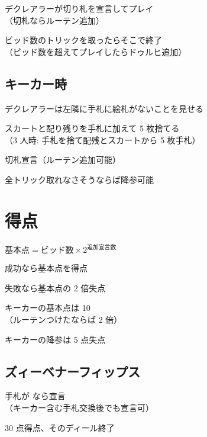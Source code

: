 \documentclass[line_length=50zw,head_space=2cm,foot_space=1cm]{jlreq}
\begin{document}
\begin{multicols}{2}
	デクレアラーが切り札を宣言してプレイ\\
	（\hmD 切札ならルーテン追加）
	
	ビッド数のトリックを取ったらそこで終了\\
	（ビッド数を超えてプレイしたらドゥルヒ追加）
	
	\subsection*{キーカー時}
	デクレアラーは左隣に手札に絵札がないことを見せる
	
	スカートと配り残りを手札に加えて 5 枚捨てる\\
	{\small （3 人時: 手札を捨て配残とスカートから 5 枚手札）}
	
	切札宣言（ルーテン追加可能）
	
	全トリック取れなさそうならば降参可能
	
	\section{得点}
	\(\text{基本点}=\text{ビッド数}\times2^\text{追加宣言数}\)
	
	成功なら基本点を得点
	
	失敗なら基本点の 2 倍失点
	
	キーカーの基本点は 10\\
	（ルーテンつけたならば 2 倍）
	
	キーカーの降参は 5 点失点
	
	\subsection*{ズィーベナーフィップス}
	手札が  なら宣言\\
	（キーカー含む手札交換後でも宣言可）
	
	30 点得点、そのディール終了
\end{multicols}
\end{document}
